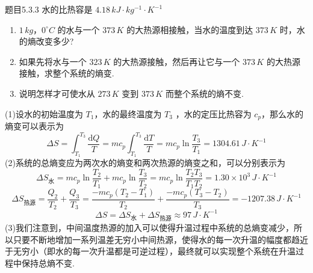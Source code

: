 \begin{question}{题目5.3.3}
    水的比热容是 $4.18 \,\si{kJ \cdot kg^{-1} \cdot K^{-1}}$
    \begin{enumerate}
        \item[(1)] $1 \,\si{kg}$，$0^\circ C$ 的水与一个 $373 \,\si{K}$ 的大热源相接触，当水的温度到达 $373 \,\si{K}$ 时，水的熵改变多少?
        \item[(2)] 如果先将水与一个 $323 \,\si{K}$ 的大热源接触，然后再让它与一个 $373 \,\si{K}$ 的大热源接触，求整个系统的熵变.
        \item[(3)] 说明怎样才可使水从 $273 \,\si{K}$ 变到 $373 \,\si{K}$ 而整个系统的熵不变.
    \end{enumerate}
\end{question}
\begin{solution}
    (1)设水的初始温度为 $T_1$，水的最终温度为 $T_3$ ，水的定压比热容为 $c_p$，那么水的熵变可以表示为
    $$
        \Delta{S} = \int_{T_1}^{T_3} \frac{\mathrm{d}Q}{T}
        = mc_p\int_{T_1}^{T_3} \frac{\mathrm{d}T}{T}
        = mc_p\ln\frac{T_3}{T_1}
        = 1304.61 \,\si{J \cdot K^{-1}}
    $$
    (2)系统的总熵变应为两次水的熵变和两次热源的熵变之和，可以分别表示为
    $$
        \Delta{S}_{\text{水}}
        = mc_p\ln\frac{T_2}{T_1} + mc_p\ln\frac{T_3}{T_2}
        = mc_p\ln\frac{T_2T_3}{T_1T_2}
        = 1.30 \times 10^3 \,\si{J \cdot K^{-1}}
    $$
    $$
        \Delta{S}_{\text{热源}}
        = \frac{Q_2}{T_2} + \frac{Q_3}{T_3}
        = \frac{-mc_p(T_2-T_1)}{T_2} + \frac{-mc_p(T_3-T_2)}{T_3}
        = -1207.38 \,\si{J \cdot K^{-1}}
    $$
    $$
        \Delta{S} = \Delta{S}_{\text{水}} + \Delta{S}_{\text{热源}}
        \approx 97 \,\si{J \cdot K^{-1}}
    $$
    (3)我们注意到，中间温度热源的加入可以使得升温过程中系统的总熵变减少，所以只要不断地增加一系列温差无穷小中间热源，使得水的每一次升温的幅度都趋近于无穷小（即水的每一次升温都是可逆过程），最终就可以实现整个系统在升温过程中保持总熵不变.
\end{solution}

